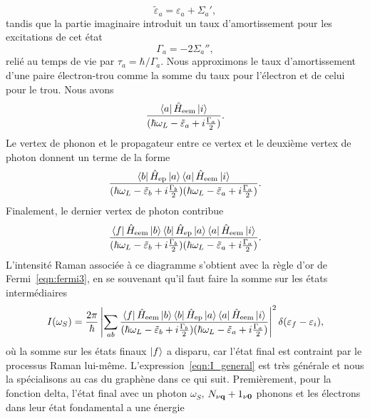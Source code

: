 \begin{equation}
    \tilde{\varepsilon}_a=\varepsilon_a +\Sigma_a',
\end{equation}
tandis que la partie imaginaire introduit un taux d'amortissement pour les excitations de cet état
\begin{equation}
    \Gamma_a =-2\Sigma_a'',
\end{equation}
relié au temps de vie par $\tau_a = \hbar/\Gamma_a$. Nous approximons le taux d'amortissement d'une paire électron-trou comme la somme du taux pour l'électron et de celui pour le trou. Nous avons
\begin{equation}
    \frac{\bra{a}\hat{H}_\text{eem}\ket{i}}{(\hbar\omega_L-\tilde{\varepsilon}_a+i\frac{\Gamma_a}{2})}.
\end{equation}
Le vertex de phonon et le propagateur entre ce vertex et le deuxième vertex de photon donnent un terme de la forme
\begin{equation}
    \frac{\bra{b}\hat{H}_\text{ep}\ket{a}\bra{a}\hat{H}_\text{eem}\ket{i}}{(\hbar\omega_L-\tilde{\varepsilon}_b+i\frac{\Gamma_b}{2})(\hbar\omega_L -\tilde{\varepsilon}_a+i\frac{\Gamma_a}{2})}.
\end{equation}
Finalement, le dernier vertex de photon contribue
\begin{equation}
    \frac{\bra{f}\hat{H}_\text{eem}\ket{b}\bra{b}\hat{H}_\text{ep}\ket{a}\bra{a}\hat{H}_\text{eem}\ket{i}}{(\hbar\omega_L-\tilde{\varepsilon}_b+i\frac{\Gamma_b}{2})(\hbar\omega_L -\tilde{\varepsilon}_a+i\frac{\Gamma_a}{2})}.
\end{equation}
L'intensité Raman associée à ce diagramme s'obtient avec la règle d'or de Fermi~\eqref{eqn:fermi3}, en se souvenant qu'il faut faire la somme sur les états intermédiaires
\begin{equation}
    I(\omega_S) = \frac{2\pi}{\hbar}\left|\sum_{ab}\frac{\bra{f}\hat{H}_\text{eem}\ket{b}\bra{b}\hat{H}_\text{ep}\ket{a}\bra{a}\hat{H}_\text{eem}\ket{i}}{(\hbar\omega_L-\tilde{\varepsilon}_b+i\frac{\Gamma_b}{2})(\hbar\omega_L -\tilde{\varepsilon}_a+i\frac{\Gamma_a}{2})}\right|^2\delta(\varepsilon_f-\varepsilon_i),\label{eqn:I_general}
\end{equation}
où la somme sur les états finaux $\ket{f}$ a disparu, car l'état final est contraint par le processus Raman lui-même. L'expression~\eqref{eqn:I_general} est très générale et nous la spécialisons au cas du graphène dans ce qui suit. Premièrement, pour la fonction delta, l'état final avec un photon $\omega_S$, $N_{\nu\mathbf{q}}+1_{\nu\bm 0}$ phonons et les électrons dans leur état fondamental a une énergie
